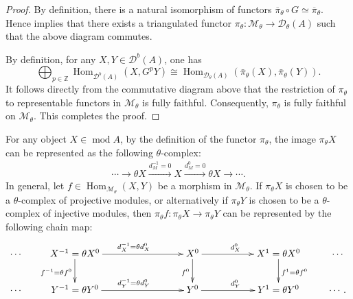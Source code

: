 \documentclass[12pt,reqno]{amsart}
\numberwithin{equation}{section}
\renewcommand{\mod}{\operatorname{mod}\nolimits}
\newcommand{\Mod}{\operatorname{Mod}\nolimits}
\newcommand{\Hom}{\operatorname{Hom}\nolimits}
\begin{document}
	\begin{proof}
		By definition, there is a natural isomorphism of functors
		$\overline{\pi}_{\theta}\circ G \simeq \overline{\pi}_{\theta}$. Hence \cite[\S 9.4]{Ke05-tri-orb-cat} implies that
		there exists a triangulated functor
		$\pi_{\theta}:\mathcal{M}_{\theta}\rightarrow \mathcal{D}_{\theta}(A)$
		such that the above diagram commutes.
		
		By definition, for any $X,Y\in \mathcal{D}^b(A)$, one has
		\[
		\bigoplus_{p\in \mathbb{Z}}\Hom_{\mathcal{D}^b(A)}(X,G^pY)\cong \Hom_{\mathcal{D}_\theta(A)}(\bar{\pi}_\theta(X),\bar{\pi}_\theta(Y)).
		\] 
		It follows directly 
		from the commutative diagram above that the restriction of $\pi_{\theta}$ to
		representable functors in $\mathcal{M}_\theta$ is fully faithful. Consequently, $\pi_{\theta}$ is
		fully faithful on $\mathcal{M}_{\theta}$. This completes the proof.
	\end{proof}
	For any object $X\in\mod A$, by the definition of the functor $\pi_\theta$, the image $\pi_\theta X$ can be represented as the following $\theta$-complex:
	\begin{align}\label{eq:pi-theta-object}
		\cdots\rightarrow \theta X \xrightarrow{d_M^{-1}=0}X\xrightarrow{d_M^0=0} \theta X\rightarrow \cdots.
	\end{align}
	In general, let
	$f\in \Hom_{\mathcal{M}_{\theta}}(X,Y)$
	be a morphism in $\mathcal{M}_{\theta}$. If $\pi_{\theta}X$ is chosen to be
	a $\theta$-complex of projective modules, or alternatively if
	$\pi_{\theta}Y$ is chosen to be a $\theta$-complex of injective modules,
	then $\pi_{\theta}f:\pi_\theta X\rightarrow \pi_\theta Y$ can be represented by the following chain map:
	\begin{align}\label{eq:pi-theta-X-2-periodic-complex}
		\begin{split}
			\xymatrix{
				\cdots &
				{X^{-1}=\theta X^0}\ar[d]_{f^{-1}=\theta f^0}
				\ar[rrr]^{d_X^{-1}=\theta d_X^0}
				&&&
				{X^0}\ar[d]_{f^0}\ar[rr]^{d_X^0}
				&&
				{X^1=\theta X^0}\ar[d]^{f^1=\theta f^0}
				& \cdots \\
				\cdots &
				{Y^{-1}=\theta Y^0}
				\ar[rrr]^{d_Y^{-1}=\theta d_Y^0}
				&&&
				Y^0\ar[rr]^{d_Y^0}
				&&
				{Y^1=\theta Y^0}
				& \cdots.
			}
		\end{split}
	\end{align}
	
	
\end{document}
